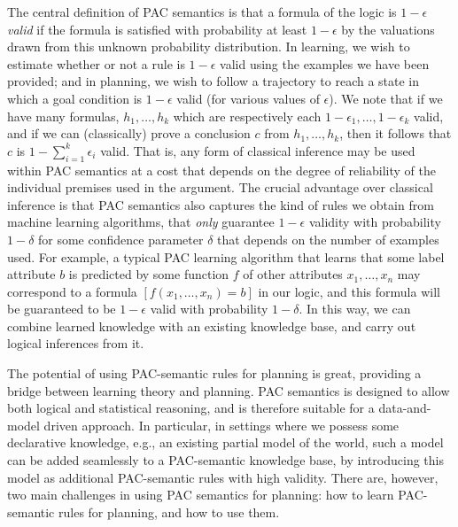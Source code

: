 \documentclass[12pt]{article}
\begin{document}
The central definition of PAC semantics is that a formula of the logic is {\em $1-\epsilon$ valid} if the formula is satisfied with probability at least $1-\epsilon$ by the valuations drawn from this unknown probability distribution. In learning, we wish to estimate whether or not a rule is $1-\epsilon$ valid using the examples we have been provided; and in planning, we wish to follow a trajectory to reach a state in which a goal condition is $1-\epsilon$ valid (for various values of $\epsilon$). We note that if we have many formulas, $h_1,\ldots,h_k$ which are respectively each $1-\epsilon_1,\ldots,1-\epsilon_k$ valid, and if we can (classically) prove a conclusion $c$ from $h_1,\ldots,h_k$, then it follows that $c$ is $1-\sum_{i=1}^k\epsilon_i$ valid. That is, any form of classical inference may be used within PAC semantics at a cost that depends on the degree of reliability of the individual premises used in the argument. The crucial advantage over classical inference is that PAC semantics also captures the kind of rules we obtain from machine learning algorithms, that {\em only} guarantee $1-\epsilon$ validity with probability $1-\delta$ for some confidence parameter $\delta$ that depends on the number of examples used. For example, a typical PAC learning algorithm that learns that some label attribute $b$ is predicted by some function $f$ of other attributes $x_1,\ldots,x_n$ may correspond to a formula $[f(x_1,\ldots,x_n) = b]$ in our logic, and this formula will be guaranteed to be $1-\epsilon$ valid with probability $1-\delta$. In this way, we can combine learned knowledge with an existing knowledge base, and carry out logical inferences from it.


The potential of using PAC-semantic rules for planning is great, providing a bridge between learning theory and planning. PAC semantics is  designed to allow both logical and statistical reasoning, and is therefore suitable for a data-and-model driven approach. In particular, in settings where we possess some declarative knowledge, e.g., an existing partial model of the world, such a model can be added seamlessly to a PAC-semantic knowledge base, by introducing this model as additional PAC-semantic rules with high validity. 
There are, however, two main challenges in using PAC semantics for planning: how to learn PAC-semantic rules for planning, and how to use them. 
\end{document}
